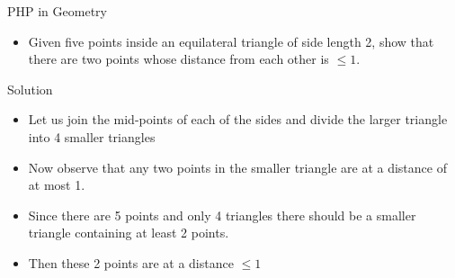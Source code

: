 \begin{frame}{PHP in Geometry}
    \begin{itemize}
        \item Given five points inside an equilateral triangle of side length 2, show that there are two points whose distance from each other is $\leq 1$.
    \end{itemize}
    \begin{figure}
        \centering
    \end{figure}
\end{frame}

\begin{frame}{Solution}
    \begin{itemize}
        \item Let us join the mid-points of each of the sides and divide the larger triangle into 4 smaller triangles
        \begin{figure}
            \centering
        \end{figure}

        \item Now observe that any two points in the smaller triangle are at a distance of at most 1.
        \item Since there are 5 points and only 4 triangles there should be a smaller triangle containing at least 2 points.
        \item Then these 2 points are at a distance $\leq 1$
    \end{itemize}
\end{frame}
